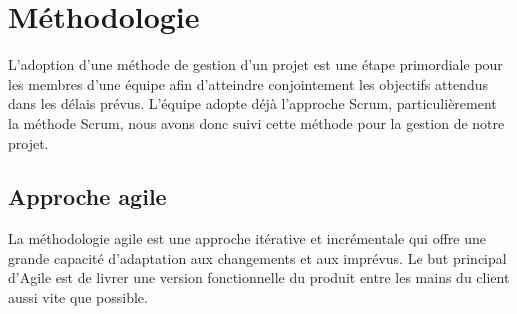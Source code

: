 \section{M\'ethodologie}
L’adoption d’une méthode de gestion d’un projet est une étape primordiale pour les membres d’une équipe afin d’atteindre conjointement les objectifs attendus dans les délais prévus.
L’équipe adopte déjà l’approche Scrum, particulièrement la méthode Scrum, nous avons donc suivi cette méthode pour la gestion de notre projet.

\subsection{Approche agile}
La méthodologie agile est une approche itérative et incrémentale qui offre une grande capacité d’adaptation aux changements et aux imprévus. Le but principal d’Agile est de livrer une version fonctionnelle du produit entre les mains du client aussi vite que possible.

